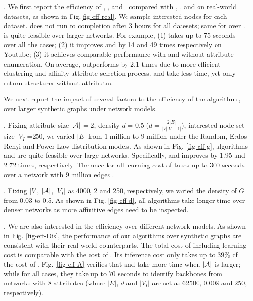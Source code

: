 .
We first report the efficiency of \approxabd, \heuabd, and \naive, compared with \cesna, \ks, and \kcore on real-world datasets, as shown in Fig.\ref{fig-eff-real}.
We sample interested nodes for each dataset.
 \cesna does not run to completion after $3$ hours for all
 datesets; same for \naive over \weibo.
   \heuabd is quite feasible over larger networks. For 
 example, (1) \heuabd takes up to 75 seconds over all the cases; (2) it improves \approxabd and \naive
 by 14 and 49 times respectively on Youtube; (3) it achieves 
 comparable performance with \kcore and \ks without
 attribute enumeration. 
On average, \approxabd outperforms
 \naive by 2.1 times due to more efficient clustering and 
 affinity attribute selection process. \kcore and \ks take less time,
 yet only return structures without attributes. 


\vspace{.5ex}
We next report the impact of several factors to the efficiency
of the algorithms, over larger synthetic graphs under network models.

. Fixing attribute size $|\A|$ = 2, density $d$ = 0.5 ($d=\frac{2|E|}{|V||V-1|}$), interested node set size $|V_I|$=250, we varied $|E|$ from $1$ million to $9$ million under the Random, Erdos-Renyi and Power-Law
distribution models. As shown in Fig. \ref{fig-eff-g},
algorithms \approxabd and \heuabd%
are quite feasible over large networks.
Specifically, \approxabd and \heuabd improves \naive
by 1.95 and 2.72 times, respectively. The once-for-all
learning cost of \heuabd takes up to 300 seconds over
a network with $9$ million edges .

. Fixing $|V|$, $|\A|$, $|V_I|$
as 4000, 2 and 250, respectively, we varied the density
of $G$ from 0.03 to 0.5. As shown in Fig. \ref{fig-eff-d},
all algorithms take longer time over denser networks as more affinitive edges
need to be inspected.

. We are also interested in
the efficiency over different network models. As shown
in Fig. \ref{fig-eff-Dis}, the performance of
our algorithms over synthetic graphs are consistent with their real-world counterparts. 
The total cost of \heuabd
including learning cost is comparable with
the cost of \approxabd. Its inference cost
only takes up to $39\%$ of the cost of \naive.
Fig.~\ref{fig-eff-A} verifies that \approxabd and \naive
take more time when $|\A|$ is larger; while for all cases,
they take up to $70$ seconds to identify backbones from networks with $8$ attributes
(where $|E|$, $d$ and $|V_I|$ are set as
62500, 0.008 and 250, respectively).

